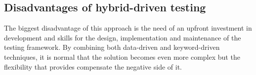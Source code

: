\subsection{Disadvantages of hybrid-driven testing}

The biggest disadvantage of this approach is the need of an upfront investment in development and skills for the design, implementation and maintenance of the testing framework. By combining both data-driven and keyword-driven techniques, it is normal that the solution becomes even more complex but the flexibility that provides compensate the negative side of it.

\newpage